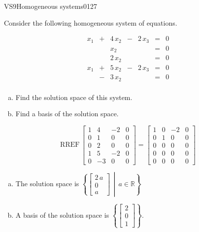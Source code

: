 \begin{exercise}{VS9}{Homogeneous systems}{0127} 
\begin{exerciseStatement} 

Consider the following homogeneous system of equations.

 \[\begin{matrix}
 x_{1} &  +  & 4 \, x_{2} &  -  & 2 \, x_{3} & = & 0 \\
 &  & x_{2} &  &  & = & 0 \\
 &  & 2 \, x_{2} &  &  & = & 0 \\
 x_{1} &  +  & 5 \, x_{2} &  -  & 2 \, x_{3} & = & 0 \\
 &  -  & 3 \, x_{2} &  &  & = & 0 \\
 \end{matrix}\] 

\begin{enumerate}[(a)]
\item  Find the solution space of this system.
\item  Find a basis of the solution space.
\end{enumerate}

     \end{exerciseStatement}
 \begin{exerciseAnswer} 

\[\mathrm{RREF}\,\left[\begin{array}{ccc|c}
1 & 4 & -2 & 0 \\
0 & 1 & 0 & 0 \\
0 & 2 & 0 & 0 \\
1 & 5 & -2 & 0 \\
0 & -3 & 0 & 0
\end{array}\right]=\left[\begin{array}{ccc|c}
1 & 0 & -2 & 0 \\
0 & 1 & 0 & 0 \\
0 & 0 & 0 & 0 \\
0 & 0 & 0 & 0 \\
0 & 0 & 0 & 0
\end{array}\right]\]

 

\begin{enumerate}[(a)]
\item The solution space is \( \left\{ \left[\begin{array}{c}
2 \, a \\
0 \\
a
\end{array}\right] \,\middle|\, a \in\mathbb R \right\} \) 
\item A basis of the solution space is \(\left\{ \left[\begin{array}{c}
2 \\
0 \\
1
\end{array}\right] \right\}\).
\end{enumerate}

     \end{exerciseAnswer}
 \end{exercise}


